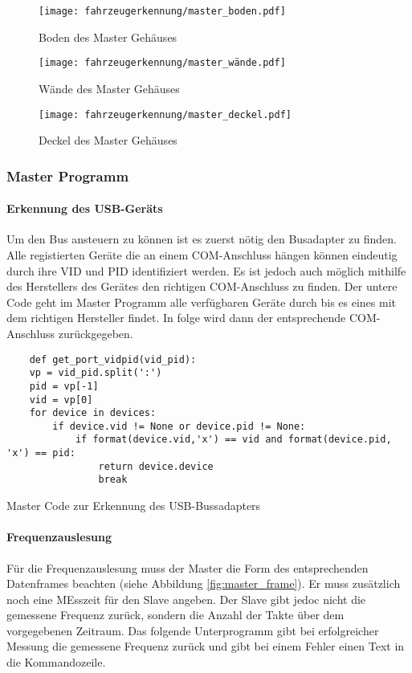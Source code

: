 \begin{figure}[!htb]
        \texttt{[image: fahrzeugerkennung/master\_boden.pdf]}
        \caption{Boden des Master Gehäuses}
    \endminipage\hfill
        \texttt{[image: fahrzeugerkennung/master\_wände.pdf]}
        \caption{Wände des Master Gehäuses}
    \endminipage\hfill
        \texttt{[image: fahrzeugerkennung/master\_deckel.pdf]}
        \caption{Deckel des Master Gehäuses}
    \endminipage
\end{figure}
\subsubsection{Master Programm}

\paragraph{Erkennung des USB-Geräts}\mbox{} 

Um den Bus ansteuern zu können ist es zuerst nötig den Busadapter zu finden. Alle registierten Geräte die an einem COM-Anschluss hängen können eindeutig durch ihre VID und PID identifiziert werden. 
Es ist jedoch auch möglich mithilfe des Herstellers des Gerätes den richtigen COM-Anschluss zu finden. Der untere Code geht im Master Programm alle verfügbaren Geräte durch bis es eines mit dem richtigen Hersteller findet.
In folge wird dann der entsprechende COM-Anschluss zurückgegeben.

\begin{listing}[H]
    \begin{verbatim}
    def get_port_vidpid(vid_pid):
    vp = vid_pid.split(':')
    pid = vp[-1]
    vid = vp[0]
    for device in devices:
        if device.vid != None or device.pid != None:
            if format(device.vid,'x') == vid and format(device.pid, 'x') == pid:
                return device.device
                break
    \end{verbatim}
    \caption{Master Code zur Erkennung des USB-Bussadapters}
\end{listing}


\paragraph{Frequenzauslesung}\mbox{} 

Für die Frequenzauslesung muss der Master die Form des entsprechenden Datenframes beachten (siehe Abbildung \ref{fig:master_frame}). Er muss zusätzlich noch eine MEsszeit für den Slave angeben. Der Slave gibt jedoc nicht die gemessene
Frequenz zurück, sondern die Anzahl der Takte über dem vorgegebenen Zeitraum. Das folgende Unterprogramm gibt bei erfolgreicher Messung die gemessene Frequenz zurück und gibt bei einem Fehler einen Text in die Kommandozeile.


